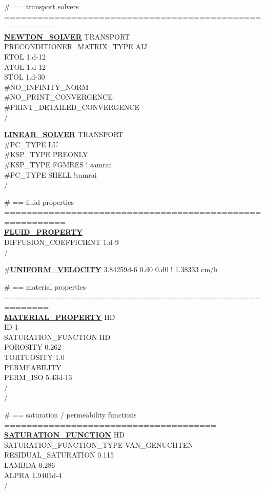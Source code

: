 \noindent
\# == transport solvers ========================================================\\
\hyperlink{target_newt}{\bf NEWTON\_SOLVER} TRANSPORT\\
PRECONDITIONER\_MATRIX\_TYPE AIJ\\
RTOL 1.d-12\\
ATOL 1.d-12\\
STOL 1.d-30\\
\#NO\_INFINITY\_NORM\\
\#NO\_PRINT\_CONVERGENCE\\
\#PRINT\_DETAILED\_CONVERGENCE\\
/

\noindent
\hyperlink{target_linsolv}{\bf LINEAR\_SOLVER} TRANSPORT\\
\#PC\_TYPE LU\\
\#KSP\_TYPE PREONLY\\
\#KSP\_TYPE FGMRES ! samrai\\
\#PC\_TYPE SHELL !samrai\\
/

\noindent
\# == fluid properties =========================================================\\
\hyperlink{target_fluid_property}{\bf FLUID\_PROPERTY}\\
DIFFUSION\_COEFFICIENT 1.d-9\\
/

\noindent
\#\hyperlink{target_unifvel}{\bf UNIFORM\_VELOCITY} 3.84259d-6 0.d0 0.d0  ! 1.38333 cm/h

\noindent
\# == material properties ======================================================\\
\hyperlink{target_mat}{\bf MATERIAL\_PROPERTY} HD\\
ID 1\\
SATURATION\_FUNCTION HD\\
POROSITY 0.262\\
TORTUOSITY 1.0\\
PERMEABILITY\\
PERM\_ISO 5.43d-13\\
/\\
/

\noindent
\# == saturation / permeability functions ======================================\\
\hyperlink{target_sat}{\bf SATURATION\_FUNCTION} HD\\
SATURATION\_FUNCTION\_TYPE VAN\_GENUCHTEN\\
RESIDUAL\_SATURATION 0.115\\
LAMBDA 0.286\\
ALPHA 1.9401d-4\\
/

